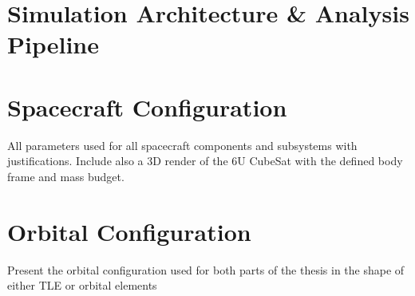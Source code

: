 \section{Simulation Architecture \& Analysis Pipeline}

\section{Spacecraft Configuration}
All parameters used for all spacecraft components and subsystems with justifications. Include also a 3D render of the 6U CubeSat with the defined body frame and mass budget. 

\section{Orbital Configuration}
Present the orbital configuration used for both parts of the thesis in the shape of either TLE or orbital elements

